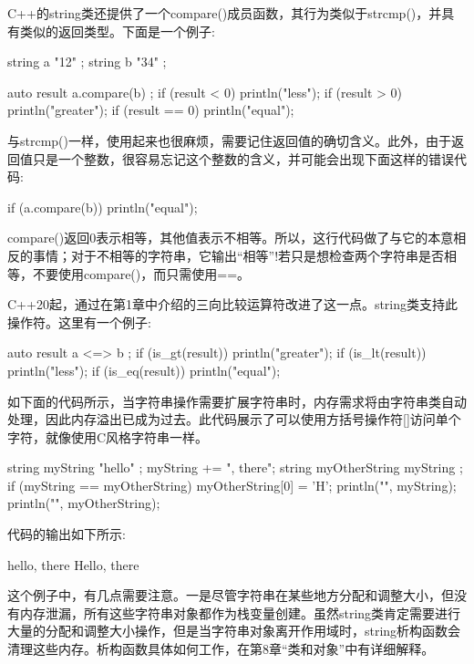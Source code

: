 C++的string类还提供了一个compare()成员函数，其行为类似于strcmp()，并具有类似的返回类型。下面是一个例子:

\begin{cpp}
string a { "12" };
string b { "34" };

auto result { a.compare(b) };
if (result < 0) { println("less"); }
if (result > 0) { println("greater"); }
if (result == 0) { println("equal"); }
\end{cpp}

与strcmp()一样，使用起来也很麻烦，需要记住返回值的确切含义。此外，由于返回值只是一个整数，很容易忘记这个整数的含义，并可能会出现下面这样的错误代码:

\begin{cpp}
if (a.compare(b)) { println("equal"); }
\end{cpp}

compare()返回0表示相等，其他值表示不相等。所以，这行代码做了与它的本意相反的事情；对于不相等的字符串，它输出“相等”!若只是想检查两个字符串是否相等，不要使用compare()，而只需使用==。

C++20起，通过在第1章中介绍的三向比较运算符改进了这一点。string类支持此操作符。这里有一个例子:

\begin{cpp}
auto result { a <=> b };
if (is_gt(result)) { println("greater"); }
if (is_lt(result)) { println("less"); }
if (is_eq(result)) { println("equal"); }
\end{cpp}


如下面的代码所示，当字符串操作需要扩展字符串时，内存需求将由字符串类自动处理，因此内存溢出已成为过去。此代码展示了可以使用方括号操作符[]访问单个字符，就像使用C风格字符串一样。

\begin{cpp}
string myString { "hello" };
myString += ", there";
string myOtherString { myString };
if (myString == myOtherString) {
    myOtherString[0] = 'H';
}
println("{}", myString);
println("{}", myOtherString);
\end{cpp}

代码的输出如下所示:

\begin{shell}
hello, there
Hello, there
\end{shell}

这个例子中，有几点需要注意。一是尽管字符串在某些地方分配和调整大小，但没有内存泄漏，所有这些字符串对象都作为栈变量创建。虽然string类肯定需要进行大量的分配和调整大小操作，但是当字符串对象离开作用域时，string析构函数会清理这些内存。析构函数具体如何工作，在第8章“类和对象”中有详细解释。

